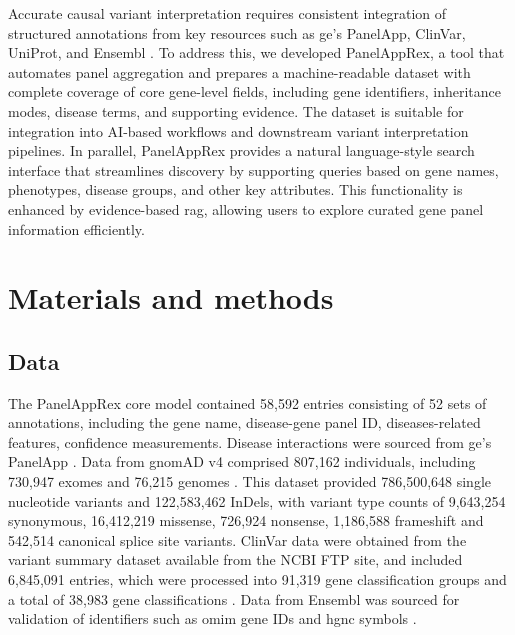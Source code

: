 Accurate causal variant interpretation requires consistent integration of structured annotations from key resources such as \ac{ge}’s PanelApp, ClinVar, UniProt, and Ensembl \cite{martin_panelapp_2019, landrum_clinvar_2018, the_uniprot_consortium_uniprot_2025, dyer_ensembl_2025}. 
To address this, we developed PanelAppRex, a tool that automates panel aggregation and prepares a machine-readable dataset with complete coverage of core gene-level fields, including gene identifiers, inheritance modes, disease terms, and supporting evidence. 
The dataset is suitable for integration into AI-based workflows and downstream variant interpretation pipelines. 
In parallel, PanelAppRex provides a natural language-style search interface that streamlines discovery by supporting queries based on gene names, phenotypes, disease groups, and other key attributes. 
This functionality is enhanced by evidence-based \ac{rag}, allowing users to explore curated gene panel information efficiently. 

\section{Materials and methods}

\subsection{Data}
The PanelAppRex core model contained 58,592 entries consisting of 52 sets of annotations, including the gene name, disease-gene panel ID, diseases-related features, confidence measurements.
Disease interactions were sourced from \ac{ge}’s PanelApp
\cite{martin_panelapp_2019}.
Data from gnomAD v4 comprised 807,162 individuals, including 730,947 exomes and 76,215 genomes \cite{karczewski2020mutational}. This dataset provided 786,500,648 single nucleotide variants and 122,583,462 InDels, with variant type counts of 9,643,254 synonymous, 16,412,219 missense, 726,924 nonsense, 1,186,588 frameshift and 542,514 canonical splice site variants. ClinVar data were obtained from the variant summary dataset 
 available from the NCBI FTP site, and included 6,845,091 entries, which were processed into 91,319 gene classification groups and a total of 38,983 gene classifications 
\cite{landrum_clinvar_2018}. 
Data from Ensembl was sourced for validation of identifiers such as \ac{omim} gene IDs and \ac{hgnc} symbols
\cite{dyer_ensembl_2025}.

